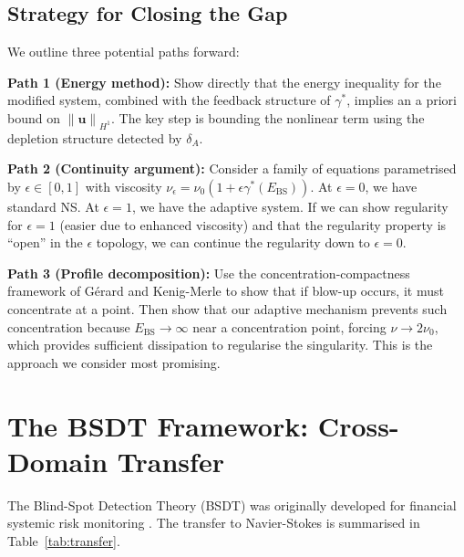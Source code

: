 \documentclass[12pt, a4paper]{article}
\newcommand{\norm}[1]{\left\| #1 \right\|}
\newcommand{\Ebs}{E_{\mathrm{BS}}}
\newcommand{\gammastar}{\gamma^*}
\begin{document}
\subsection{Strategy for Closing the Gap}

We outline three potential paths forward:

\textbf{Path 1 (Energy method):}
Show directly that the energy inequality for the modified system,
combined with the feedback structure of $\gammastar$, implies an
a priori bound on $\norm{\mathbf{u}}_{H^1}$.
The key step is bounding the nonlinear term using the depletion
structure detected by $\delta_A$.

\textbf{Path 2 (Continuity argument):}
Consider a family of equations parametrised by $\epsilon \in [0, 1]$
with viscosity $\nu_\epsilon = \nu_0(1 + \epsilon \gammastar(\Ebs))$.
At $\epsilon = 0$, we have standard NS.
At $\epsilon = 1$, we have the adaptive system.
If we can show regularity for $\epsilon = 1$ (easier due to enhanced
viscosity) and that the regularity property is ``open'' in the
$\epsilon$ topology, we can continue the regularity down to
$\epsilon = 0$.

\textbf{Path 3 (Profile decomposition):}
Use the concentration-compactness framework of G\'{e}rard
\cite{gerard1998} and Kenig-Merle \cite{km2006}
to show that if blow-up occurs, it must concentrate at a point.
Then show that our adaptive mechanism prevents such concentration
because $\Ebs \to \infty$ near a concentration point, forcing
$\nu \to 2\nu_0$, which provides sufficient dissipation to
regularise the singularity. This is the approach we consider
most promising.


\section{The BSDT Framework: Cross-Domain Transfer}\label{sec:transfer}

The Blind-Spot Detection Theory (BSDT) was originally developed
for financial systemic risk monitoring \cite{odeyemi2025mfls}.
The transfer to Navier-Stokes is summarised in Table~\ref{tab:transfer}.
\end{document}
